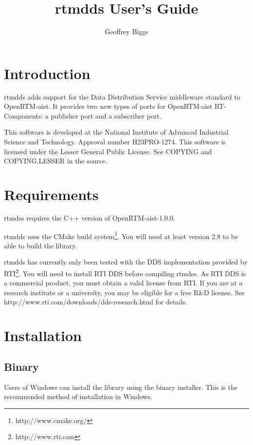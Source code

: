 \documentclass[a4paper,10pt]{article}
\title{rtmdds User's Guide}
\author{Geoffrey Biggs}
\begin{document}
\maketitle

\section{Introduction}
\label{sec:intro}

rtmdds adds support for the Data Distribution Service middleware
standard to OpenRTM-aist. It provides two new types of ports for
OpenRTM-aist RT-Components: a publisher port and a subscriber port.

This software is developed at the National Institute of Advanced Industrial
Science and Technology. Approval number H23PRO-1274. This software is licensed
under the Lesser General Public License. See COPYING and COPYING.LESSER in the
source.

\section{Requirements}
\label{sec:requirements}

rtmdss requires the C++ version of OpenRTM-aist-1.0.0.

rtmdds uses the CMake build system\footnote{http://www.cmake.org/}. You
will need at least version 2.8 to be able to build the library.

rtmdds has currently only been tested with the DDS implementation
provided by RTI\footnote{http://www.rti.com}. You will need to install
RTI DDS before compiling rtmdss. As RTI DDS is a commercial product, you
must obtain a valid license from RTI. If you are at a research institute
or a university, you may be eligible for a free R\&D license. See
http://www.rti.com/downloads/dds-research.html for details.

\section{Installation}
\label{sec:installation}

\subsection{Binary}

Users of Windows can install the library using the binary installer.
This is the recommended method of installation in Windows.
\end{document}
